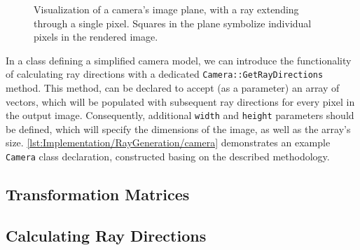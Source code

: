 \begin{figure}[!ht]

    \vspace{1cm}

    \caption[Visualization of a camera's image plane]{
        \centering
        Visualization of a camera's image plane, with a ray extending through a single pixel. Squares in the plane symbolize individual pixels in the rendered image. 
    }
    \label{fig:Implementation/RayGeneration/iamge_plane}
\end{figure}
\vfill

In a class defining a simplified camera model, we can introduce the functionality of calculating ray directions with a dedicated \verb|Camera::GetRayDirections| method. 
This method, can be declared to accept (as a parameter) an array of vectors, which will be populated with subsequent ray directions for every pixel in the output image.
Consequently, additional \verb|width| and \verb|height| parameters should be defined, which will specify the dimensions of the image, as well as the array's size.
\cref{lst:Implementation/RayGeneration/camera} demonstrates an example \verb|Camera| class declaration, constructed basing on the described methodology.

\vfill
\begin{figure}[!ht]
    \vspace{1cm}

    
\end{figure}
\vfill

\subsection{Transformation Matrices}

\subsection{Calculating Ray Directions}

